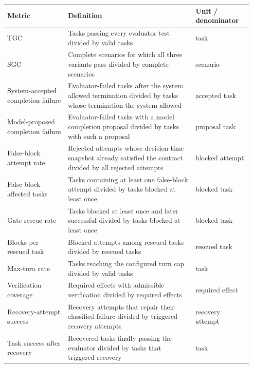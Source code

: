 \begin{center}
\begin{minipage}{\linewidth}
\centering
{}
\label{tab:completion-metric-definitions}
\small
\begin{tabularx}{\linewidth}{@{}lYY@{}}
\toprule
Metric & Definition & Unit / denominator \\
\midrule
TGC & Tasks passing every evaluator test divided by valid tasks & task \\
SGC & Complete scenarios for which all three variants pass divided by complete scenarios & scenario \\
System-accepted completion failure & Evaluator-failed tasks after the system allowed termination divided by tasks whose termination the system allowed & accepted task \\
Model-proposed completion failure & Evaluator-failed tasks with a model completion proposal divided by tasks with such a proposal & proposal task \\
False-block attempt rate & Rejected attempts whose decision-time snapshot already satisfied the contract divided by all rejected attempts & blocked attempt \\
False-block affected tasks & Tasks containing at least one false-block attempt divided by tasks blocked at least once & blocked task \\
Gate rescue rate & Tasks blocked at least once and later successful divided by tasks blocked at least once & blocked task \\
Blocks per rescued task & Blocked attempts among rescued tasks divided by rescued tasks & rescued task \\
Max-turn rate & Tasks reaching the configured turn cap divided by valid tasks & task \\
Verification coverage & Required effects with admissible verification divided by required effects & required effect \\
Recovery-attempt success & Recovery attempts that repair their classified failure divided by triggered recovery attempts & recovery attempt \\
Task success after recovery & Recovered tasks finally passing the evaluator divided by tasks that triggered recovery & task \\
\bottomrule
\end{tabularx}
\end{minipage}
\end{center}

